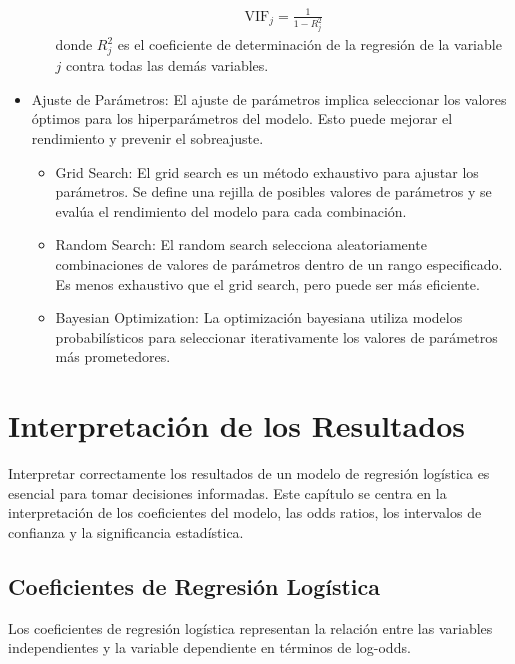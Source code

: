 \documentclass[a4paper]{report} %
\begin{document}
\begin{itemize}
\begin{itemize}
\begin{eqnarray*}
\text{VIF}_j = \frac{1}{1 - R_j^2}
\end{eqnarray*}
donde $R_j^2$ es el coeficiente de determinaci\'on de la regresi\'on de la variable $j$ contra todas las dem\'as variables.
\end{itemize}

\item Ajuste de Par\'ametros: El ajuste de par\'ametros implica seleccionar los valores \'optimos para los hiperpar\'ametros del modelo. Esto puede mejorar el rendimiento y prevenir el sobreajuste.
\begin{itemize}
\item Grid Search: El grid search es un m\'etodo exhaustivo para ajustar los par\'ametros. Se define una rejilla de posibles valores de par\'ametros y se eval\'ua el rendimiento del modelo para cada combinaci\'on.

\item Random Search: El random search selecciona  aleatoriamente combinaciones de valores de par\'ametros dentro de un rango especificado. Es menos exhaustivo que el grid search, pero puede ser m\'as eficiente.

\item Bayesian Optimization: La optimizaci\'on bayesiana utiliza modelos probabil\'isticos para seleccionar iterativamente los valores de par\'ametros m\'as prometedores.
\end{itemize}
\end{itemize}


\chapter{Interpretaci\'on de los Resultados}

Interpretar correctamente los resultados de un modelo de regresi\'on log\'istica es esencial para tomar decisiones informadas. Este cap\'itulo se centra en la interpretaci\'on de los coeficientes del modelo, las odds ratios, los intervalos de confianza y la significancia estad\'istica.

\section{Coeficientes de Regresi\'on Log\'istica}

Los coeficientes de regresi\'on log\'istica representan la relaci\'on entre las variables independientes y la variable dependiente en t\'erminos de log-odds. 
\end{document}
